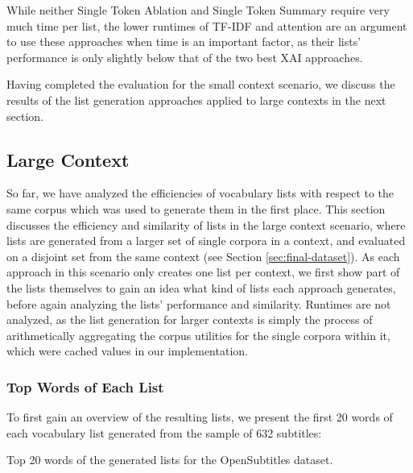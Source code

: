 While neither Single Token Ablation and Single Token Summary require very much time per list, the lower runtimes of TF-IDF and attention are an argument to use these approaches when time is an important factor, as their lists' performance is only slightly below that of the two best XAI approaches.

Having completed the evaluation for the small context scenario, we discuss the results of the list generation approaches applied to large contexts in the next section.

\subsection{Large Context} \label{sec:results-large-context}
So far, we have analyzed the efficiencies of vocabulary lists with respect to the same corpus which was used to generate them in the first place.
This section discusses the efficiency and similarity of lists in the large context scenario, where lists are generated from a larger set of single corpora in a context, and evaluated on a disjoint set from the same context (see Section \ref{sec:final-dataset}).
As each approach in this scenario only creates one list per context, we first show part of the lists themselves to gain an idea what kind of lists each approach generates, before again analyzing the lists' performance and similarity.
Runtimes are not analyzed, as the list generation for larger contexts is simply the process of arithmetically aggregating the corpus utilities for the single corpora within it, which were cached values in our implementation.

\subsubsection{Top Words of Each List}
To first gain an overview of the resulting lists, we present the first 20 words of each vocabulary list generated from the sample of 632 subtitles:

\begin{table}[H]
	\centering
	
	\caption{Top 20 words of the generated lists for the OpenSubtitles dataset.}
	\label{tbl:first-k-words-opensubs}
\end{table}

